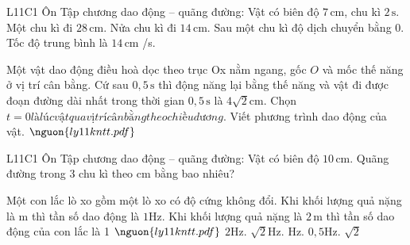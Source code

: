 \begin{ex}
L11C1 Ôn Tập chương dao động – quãng đường: Vật có biên độ $7\,\text{cm}$, chu kì $2\,\text{s}$.
\choiceTF
{\True Một chu kì đi $28\,\text{cm}$.}
{\True Nửa chu kì đi $14\,\text{cm}$.}
{\True Sau một chu kì độ dịch chuyển bằng 0.}
{\True Tốc độ trung bình là $14\,\text{cm}$ /s.}
\end{ex}

\begin{ex}
Một vật dao động điều hoà dọc theo trục Ox nằm ngang, gốc $O$ và mốc thế năng ở vị trí cân bằng. Cứ sau $0,5\,\mathrm{s}$ thì động năng lại bằng thế năng và vật đi được đoạn đường dài nhất trong thời gian $0,5\,\mathrm{s}$ là $4\sqrt{2} \mathrm{cm}$. Chọn $t = 0 là lúc vật qua vị trí cân bằng theo chiều dương$. Viết phương trình dao động của vật. $\nguon{ly11 kntt.pdf}$
\choiceTF

\end{ex}

\begin{ex}
L11C1 Ôn Tập chương dao động – quãng đường: Vật có biên độ $10\,\text{cm}$. Quãng đường trong 3 chu kì theo cm bằng bao nhiêu?
\end{ex}

\begin{ex}
Một con lắc lò xo gồm một lò xo có độ cứng không đổi. Khi khối lượng quả nặng là m thì tần số dao động là $1 \mathrm{Hz}$. Khi khối lượng quả nặng là $2\,\text{m}$ thì tần số dao động của con lắc là 1 $\nguon{ly11 kntt.pdf}$
\choice
{$2 \mathrm{Hz}$.}
{$\sqrt{2} \mathrm{Hz}.$}
{\True $\mathrm{Hz}.$}
{$0,5 \mathrm{Hz}$. $\sqrt{2}$}
\end{ex}

